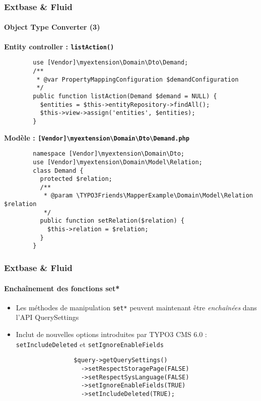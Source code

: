 \begin{frame}[fragile]
	\frametitle{Extbase \& Fluid}
	\framesubtitle{Object Type Converter (3)}

	\lstset{
		basicstyle=\tiny\ttfamily
	}

	\smaller\textbf{Entity controller : \texttt{listAction()}}\normalsize
	\begin{lstlisting}
		use [Vendor]\myextension\Domain\Dto\Demand;
		/**
		 * @var PropertyMappingConfiguration $demandConfiguration
		 */
		public function listAction(Demand $demand = NULL) {
		  $entities = $this->entityRepository->findAll();
		  $this->view->assign('entities', $entities);
		}
	\end{lstlisting}

	\smaller\textbf{Modèle : \texttt{[Vendor]\textbackslash myextension\textbackslash Domain\textbackslash Dto\textbackslash Demand.php}}\normalsize
	\begin{lstlisting}
		namespace [Vendor]\myextension\Domain\Dto;
		use [Vendor]\myextension\Domain\Model\Relation;
		class Demand {
		  protected $relation;
		  /**
		   * @param \TYPO3Friends\MapperExample\Domain\Model\Relation $relation
		   */
		  public function setRelation($relation) {
		    $this->relation = $relation;
		  }
		}
	\end{lstlisting}

\end{frame}


\begin{frame}[fragile]
	\frametitle{Extbase \& Fluid}
	\framesubtitle{Enchaînement des fonctions set*}

	\lstset{
		basicstyle=\tiny\ttfamily
	}

	\begin{itemize}
		\item Les méthodes de manipulation \texttt{set*} peuvent maintenant être \emph{enchaînées} dans l'API QuerySettings
		\item Inclut de nouvelles options introduites par TYPO3 CMS 6.0 :\newline
			\texttt{setIncludeDeleted} et \texttt{setIgnoreEnableFields}

			\begin{lstlisting}
				$query->getQuerySettings()
				  ->setRespectStoragePage(FALSE)
				  ->setRespectSysLanguage(FALSE)
				  ->setIgnoreEnableFields(TRUE)
				  ->setIncludeDeleted(TRUE);
			\end{lstlisting}
	\end{itemize}

\end{frame}

